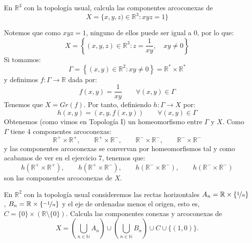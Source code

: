 \begin{ejercicio}
    En $\mathbb{R}^3$ con la topología usual, calcula las componentes arcoconexas de
    \begin{equation*}
        X = \{x,y,z) \in \mathbb{R}^3 : xyz = 1\}
    \end{equation*}

    \noindent
    Notemos que como $xyz = 1$, ninguno de ellos puede ser igual a 0, por lo que:
    \begin{equation*}
        X = \left\{(x,y,z)\in \mathbb{R}^3 : z=\dfrac{1}{xy} ,\quad  xy\neq 0\right\}
    \end{equation*}
    Si tomamos:
    \begin{equation*}
        \Gamma = \left\{(x,y) \in \mathbb{R}^2 : xy \neq 0\right\} = \mathbb{R}^\ast \times \mathbb{R}^\ast
    \end{equation*}
    y definimos $f:\Gamma\to \mathbb{R}$ dada por:
    \begin{equation*}
        f(x,y) = \dfrac{1}{xy} \qquad \forall (x,y)\in \Gamma
    \end{equation*}
    Tenemos que $X = Gr(f)$. Por tanto, definiendo $h:\Gamma\to X$ por:
    \begin{equation*}
        h(x,y) = (x,y,f(x,y)) \qquad \forall (x,y)\in \Gamma
    \end{equation*}
    Obtenemos (como vimos en Topología I) un homeomorfismo entre $\Gamma$ y $X$. Como $\Gamma$ tiene 4 componentes arcoconexas:
    \begin{equation*}
        \mathbb{R}^+\times \mathbb{R}^+, \qquad \mathbb{R}^+\times \mathbb{R}^-, \qquad \mathbb{R}^-\times\mathbb{R}^-, \qquad \mathbb{R}^-\times\mathbb{R}^-
    \end{equation*}
    y las componentes arcoconexas se convervan por homeomorfismos tal y como acabamos de ver en el ejercicio 7, tenemos que:
    \begin{equation*}
        h(\mathbb{R}^+\times \mathbb{R}^+), \qquad h(\mathbb{R}^+\times \mathbb{R}^-), \qquad h(\mathbb{R}^-\times\mathbb{R}^-), \qquad h(\mathbb{R}^-\times\mathbb{R}^-)
    \end{equation*}
    son las componentes arcoconexas de $X$.
\end{ejercicio}

\begin{ejercicio} %
    En $\mathbb{R}^2$ con la topología usual consideremos las rectas horizontales $A_n = \mathbb{R}\times \{\nicefrac{1}{n}\}$, $B_n = \mathbb{R}\times \{\nicefrac{-1}{n}\}$ y el eje de ordenadas menos el origen, esto es, $C=\{0\}\times (\mathbb{R}\setminus \{0\})$. Calcula las componentes conexas y arcoconexas de
    \begin{equation*}
        X = \left(\bigcup_{n\in \mathbb{N}}A_n\right) \cup \left(\bigcup_{n\in \mathbb{N}}B_n\right) \cup C \cup \{(1,0)\}.
    \end{equation*}
\end{ejercicio}

